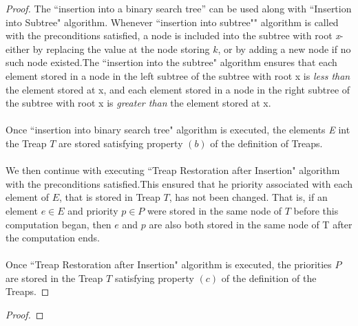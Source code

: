 \documentclass[12pt]{article}
\newenvironment{problem}[2][Problem]{\begin{trivlist}
\item[\hskip \labelsep {\bfseries #1}\hskip \labelsep {\bfseries #2.}]}{\end{trivlist}}
\begin{document}
\begin{proof}
The ``insertion into a binary search tree'' can be used along with ``Insertion into Subtree" algorithm. Whenever ``insertion into subtree"" algorithm is called with the preconditions satisfied, a node is included into the subtree with root \emph{x}- either by replacing the value at the node storing $k$, or by adding a new node if no such node existed.The ``insertion into the subtree" algorithm ensures that each element stored in a node in the left subtree of the subtree with root x is \emph{less than} the element stored at x, and each element stored in a node in the
right subtree of the subtree with root x is \emph{greater than} the element stored at x. 
\\ \\
Once ``insertion into binary search tree" algorithm is executed, the elements \emph{E} int the Treap $T$ are stored satisfying property $(b)$ of the definition of Treaps.
\\ \\
We then continue with executing ``Treap Restoration after Insertion" algorithm with the preconditions satisfied.This ensured that he priority associated with each element of $E$, that is stored in Treap $T$, has not been changed. That is, if an element $e \in E$ and priority $p \in P$ were stored in the same node of $T$ before this computation began, then $e$ and $p$ are also both stored in the same node of T after the computation ends.
\\ \\
Once ``Treap Restoration after Insertion" algorithm is executed, the priorities $P$ are stored in the Treap $T$ satisfying property $(c)$ of the definition of the Treaps.
\end{proof}



\begin{problem}{2}

\end{problem}

\begin{proof}

\end{proof}
\end{document}
